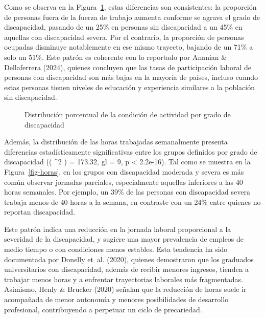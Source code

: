 \documentclass[
  11pt,
  oneside]{article}
\begin{document}
Como se observa en la Figura~\ref{fig-condic}, estas diferencias son
consistentes: la proporción de personas fuera de la fuerza de trabajo
aumenta conforme se agrava el grado de discapacidad, pasando de un 25\%
en personas sin discapacidad a un 45\% en aquellas con discapacidad
severa. Por el contrario, la proporción de personas ocupadas disminuye
notablemente en ese mismo trayecto, bajando de un 71\% a solo un 51\%.
Este patrón es coherente con lo reportado por Ananian \& Dellaferrera
(2024), quienes concluyen que las tasas de participación laboral de
personas con discapacidad son más bajas en la mayoría de países, incluso
cuando estas personas tienen niveles de educación y experiencia
similares a la población sin discapacidad.

\begin{figure}


\caption{\label{fig-condic}Distribución porcentual de la condición de
actividad por grado de discapacidad}

\end{figure}%

Además, la distribución de las horas trabajadas semanalmente presenta
diferencias estadísticamente significativas entre los grupos definidos
por grado de discapacidad (( \chi\^{}2 ) = 173.32, gl = 9, p \textless{}
2.2e-16). Tal como se muestra en la Figura~\ref{fig-horas}, en los
grupos con discapacidad moderada y severa es más común observar jornadas
parciales, especialmente aquellas inferiores a las 40 horas semanales.
Por ejemplo, un 39\% de las personas con discapacidad severa trabaja
menos de 40 horas a la semana, en contraste con un 24\% entre quienes no
reportan discapacidad.

Este patrón indica una reducción en la jornada laboral proporcional a la
severidad de la discapacidad, y sugiere una mayor prevalencia de empleos
de medio tiempo o con condiciones menos estables. Esta tendencia ha sido
documentada por Donelly et~al. (2020), quienes demostraron que los
graduados universitarios con discapacidad, además de recibir menores
ingresos, tienden a trabajar menos horas y a enfrentar trayectorias
laborales más fragmentadas. Asimismo, Henly \& Brucker (2020) señalan
que la reducción de horas suele ir acompañada de menor autonomía y
menores posibilidades de desarrollo profesional, contribuyendo a
perpetuar un ciclo de precariedad.
\end{document}
